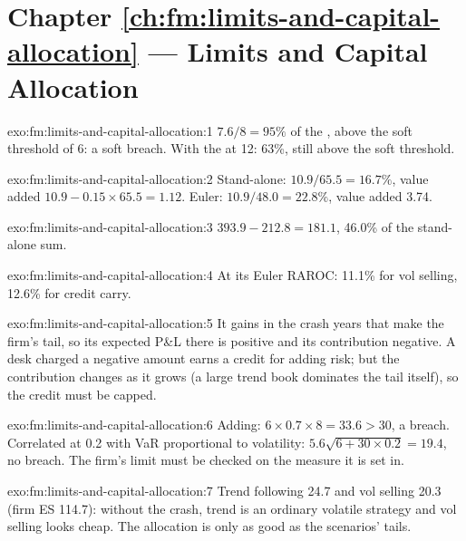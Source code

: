 \section*{Chapter \ref{ch:fm:limits-and-capital-allocation} --- Limits and Capital Allocation}

\begin{solution}{exo:fm:limits-and-capital-allocation:1}
$7.6/8=95\%$ of the , above the soft threshold of 6: a soft breach. With the  at 12: 63\%, still above the soft threshold.
\end{solution}

\begin{solution}{exo:fm:limits-and-capital-allocation:2}
Stand-alone: $10.9/65.5=16.7\%$, value added $10.9-0.15\times65.5=1.12$. Euler: $10.9/48.0=22.8\%$, value added 3.74.
\end{solution}

\begin{solution}{exo:fm:limits-and-capital-allocation:3}
$393.9-212.8=181.1$, 46.0\% of the stand-alone sum.
\end{solution}

\begin{solution}{exo:fm:limits-and-capital-allocation:4}
At its Euler RAROC: 11.1\% for vol selling, 12.6\% for credit carry.
\end{solution}

\begin{solution}{exo:fm:limits-and-capital-allocation:5}
It gains in the crash years that make the firm's tail, so its expected P\&L there is positive and its contribution negative. A desk charged a
negative amount earns a credit for adding risk; but the contribution changes as it grows (a large trend book dominates the tail itself), so the
credit must be capped.
\end{solution}

\begin{solution}{exo:fm:limits-and-capital-allocation:6}
Adding: $6\times0.7\times8=33.6>30$, a breach. Correlated at 0.2 with VaR proportional to volatility: $5.6\sqrt{6+30\times0.2}=19.4$, no breach.
The firm's limit must be checked on the measure it is set in.
\end{solution}

\begin{solution}{exo:fm:limits-and-capital-allocation:7}
Trend following 24.7 and vol selling 20.3 (firm ES 114.7): without the crash, trend is an ordinary volatile strategy and vol selling looks cheap.
The allocation is only as good as the scenarios' tails.
\end{solution}

